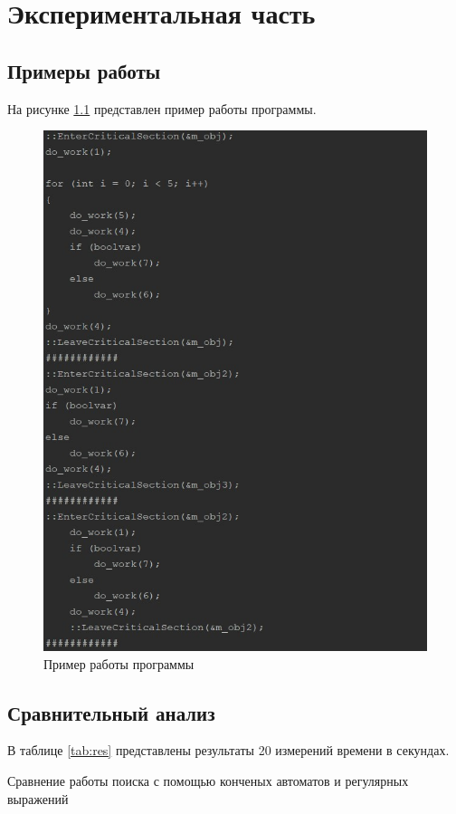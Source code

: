 \documentclass[12pt, a4paper]{report}
\begin{document}
	\newpage


	\chapter{Экспериментальная часть}
	\section{Примеры работы}
	\hspace{0.5cm}На рисунке \ref{fig:example} представлен пример работы программы.
	\begin{figure}[ht!]
		\centering
		\includegraphics[width=0.7\linewidth]{example.jpg}
		\caption{Пример работы программы}
		\label{fig:example}
	\end{figure}

	\section{Сравнительный анализ}
	В таблице \ref{tab:res} представлены результаты 20 измерений времени в секундах.
	\begin{table}[ht!]
		\caption{Сравнение работы поиска с помощью конченых автоматов и регулярных выражений}
		\label{tab:res}
		\begin{center}
		\end{center}
	\end{table}
\end{document}
